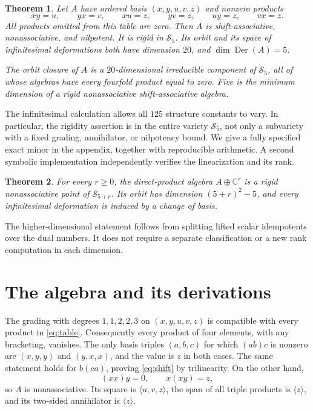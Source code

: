 \documentclass[11pt]{article}
\newtheorem{theorem}{Theorem}
\theoremstyle{remark}
\newcommand{\C}{\mathbb C}
\newcommand{\SAs}{\mathcal S}
\newcommand{\Der}{\operatorname{Der}}
\begin{document}
\begin{theorem}\label{thm:main}
Let $A$ have ordered basis $(x,y,u,v,z)$ and nonzero products
\begin{equation}\label{eq:table}
 xy=u,\qquad yx=v,\qquad xu=z,\qquad yv=z,\qquad uy=z,\qquad vx=z.
\end{equation}
All products omitted from this table are zero. Then $A$ is shift-associative, nonassociative, and nilpotent. It is rigid in $\SAs_5$. Its orbit and its space of infinitesimal deformations both have dimension $20$, and $\dim\Der(A)=5$.

The orbit closure of $A$ is a $20$-dimensional irreducible component of $\SAs_5$, all of whose algebras have every fourfold product equal to zero. Five is the minimum dimension of a rigid nonassociative shift-associative algebra.
\end{theorem}

The infinitesimal calculation allows all $125$ structure constants to vary. In particular, the rigidity assertion is in the entire variety $\SAs_5$, not only a subvariety with a fixed grading, annihilator, or nilpotency bound. We give a fully specified exact minor in the appendix, together with reproducible arithmetic. A second symbolic implementation independently verifies the linearization and its rank.

\begin{theorem}\label{thm:extension}
For every $r\ge0$, the direct-product algebra $A\oplus\C^r$ is a rigid nonassociative point of $\SAs_{5+r}$. Its orbit has dimension $(5+r)^2-5$, and every infinitesimal deformation is induced by a change of basis.
\end{theorem}

The higher-dimensional statement follows from splitting lifted scalar idempotents over the dual numbers. It does not require a separate classification or a new rank computation in each dimension.

\section{The algebra and its derivations}
The grading with degrees $1,1,2,2,3$ on $(x,y,u,v,z)$ is compatible with every product in \eqref{eq:table}. Consequently every product of four elements, with any bracketing, vanishes. The only basis triples $(a,b,c)$ for which $(ab)c$ is nonzero are $(x,y,y)$ and $(y,x,x)$, and the value is $z$ in both cases. The same statement holds for $b(ca)$, proving \eqref{eq:shift} by trilinearity. On the other hand,
\[
 (xx)y=0,\qquad x(xy)=z,
\]
so $A$ is nonassociative. Its square is $\langle u,v,z\rangle$, the span of all triple products is $\langle z\rangle$, and its two-sided annihilator is $\langle z\rangle$.
\end{document}
